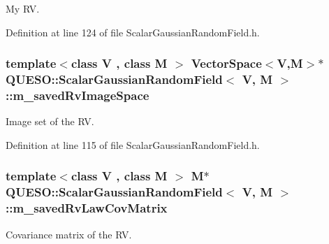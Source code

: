 My R\-V. 



Definition at line 124 of file Scalar\-Gaussian\-Random\-Field.\-h.

\hypertarget{class_q_u_e_s_o_1_1_scalar_gaussian_random_field_aaffc22808e1c4a88073a171d781412a5}{
\subsubsection[{m\-\_\-saved\-Rv\-Image\-Space}]{\setlength{\rightskip}{0pt plus 5cm}template$<$class V , class M $>$ {\bf Vector\-Space}$<$V,M$>$$\ast$ {\bf Q\-U\-E\-S\-O\-::\-Scalar\-Gaussian\-Random\-Field}$<$ V, M $>$\-::m\-\_\-saved\-Rv\-Image\-Space\hspace{0.3cm}{\ttfamily [protected]}}}\label{class_q_u_e_s_o_1_1_scalar_gaussian_random_field_aaffc22808e1c4a88073a171d781412a5}


Image set of the R\-V. 



Definition at line 115 of file Scalar\-Gaussian\-Random\-Field.\-h.

\hypertarget{class_q_u_e_s_o_1_1_scalar_gaussian_random_field_aca6f26fffd99c7d8fee7a8300e623dcd}{
\subsubsection[{m\-\_\-saved\-Rv\-Law\-Cov\-Matrix}]{\setlength{\rightskip}{0pt plus 5cm}template$<$class V , class M $>$ M$\ast$ {\bf Q\-U\-E\-S\-O\-::\-Scalar\-Gaussian\-Random\-Field}$<$ V, M $>$\-::m\-\_\-saved\-Rv\-Law\-Cov\-Matrix\hspace{0.3cm}{\ttfamily [protected]}}}\label{class_q_u_e_s_o_1_1_scalar_gaussian_random_field_aca6f26fffd99c7d8fee7a8300e623dcd}


Covariance matrix of the R\-V. 



